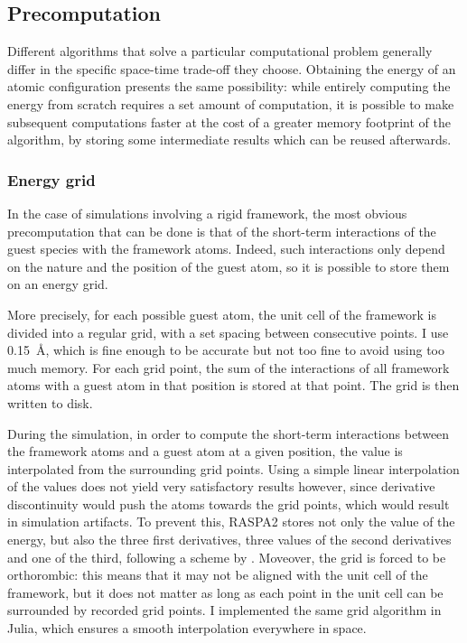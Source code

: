 \documentclass[main.tex]{subfiles}
\begin{document}
\subsection{Precomputation}

\label{precomputations}

Different algorithms that solve a particular computational problem generally differ in the specific space-time trade-off they choose. Obtaining the energy of an atomic configuration presents the same possibility: while entirely computing the energy from scratch requires a set amount of computation, it is possible to make subsequent computations faster at the cost of a greater memory footprint of the algorithm, by storing some intermediate results which can be reused afterwards.

\subsubsection{Energy grid}

\label{energygrid}

In the case of simulations involving a rigid framework, the most obvious precomputation that can be done is that of the short-term interactions of the guest species with the framework atoms. Indeed, such interactions only depend on the nature and the position of the guest atom, so it is possible to store them on an energy grid.

More precisely, for each possible guest atom, the unit cell of the framework is divided into a regular grid, with a set spacing between consecutive points. I use \qty{0.15}{\angstrom}, which is fine enough to be accurate but not too fine to avoid using too much memory. For each grid point, the sum of the interactions of all framework atoms with a guest atom in that position is stored at that point. The grid is then written to disk.

During the simulation, in order to compute the short-term interactions between the framework atoms and a guest atom at a given position, the value is interpolated from the surrounding grid points. Using a simple linear interpolation of the values does not yield very satisfactory results however, since derivative discontinuity would push the atoms towards the grid points, which would result in simulation artifacts. To prevent this, RASPA2 stores not only the value of the energy, but also the three first derivatives, three values of the second derivatives and one of the third, following a scheme by \textcite{TricubicGridInterpolaction}. Moveover, the grid is forced to be orthorombic: this means that it may not be aligned with the unit cell of the framework, but it does not matter as long as each point in the unit cell can be surrounded by recorded grid points. I implemented the same grid algorithm in Julia, which ensures a smooth interpolation everywhere in space.
\end{document}
